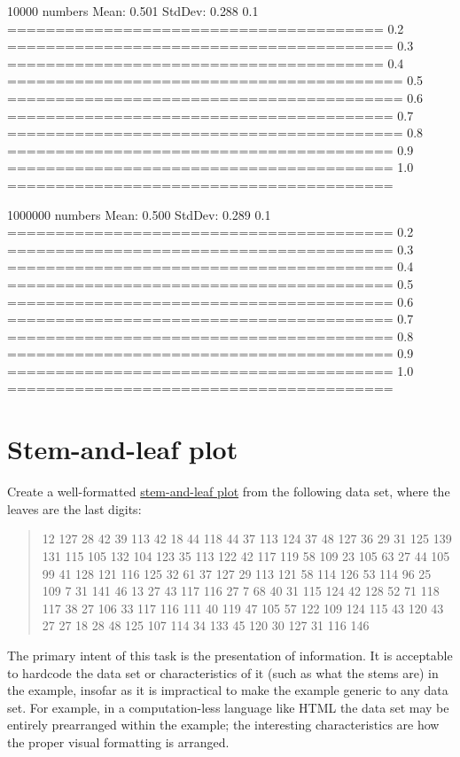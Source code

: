 \begin{itemize}
\begin{wideverbatim}
10000 numbers
Mean:   0.501
StdDev: 0.288
0.1 =======================================
0.2 ========================================
0.3 =======================================
0.4 =========================================
0.5 =========================================
0.6 ========================================
0.7 =========================================
0.8 ========================================
0.9 ========================================
1.0 ========================================

1000000 numbers
Mean:   0.500
StdDev: 0.289
0.1 ========================================
0.2 ========================================
0.3 ========================================
0.4 ========================================
0.5 ========================================
0.6 ========================================
0.7 ========================================
0.8 ========================================
0.9 ========================================
1.0 ========================================

\end{wideverbatim}

\pagebreak{}
\section*{Stem-and-leaf plot}

Create a well-formatted
\href{http://en.wikipedia.org/wiki/Stem-and-leaf\_plot}{stem-and-leaf
plot} from the following data set, where the leaves are the last digits:

\begin{quote}
12 127 28 42 39 113 42 18 44 118 44 37 113 124 37 48 127 36 29 31 125
139 131 115 105 132 104 123 35 113 122 42 117 119 58 109 23 105 63 27 44
105 99 41 128 121 116 125 32 61 37 127 29 113 121 58 114 126 53 114 96
25 109 7 31 141 46 13 27 43 117 116 27 7 68 40 31 115 124 42 128 52 71
118 117 38 27 106 33 117 116 111 40 119 47 105 57 122 109 124 115 43 120
43 27 27 18 28 48 125 107 114 34 133 45 120 30 127 31 116 146
\end{quote}

The primary intent of this task is the presentation of information. It
is acceptable to hardcode the data set or characteristics of it (such as
what the stems are) in the example, insofar as it is impractical to make
the example generic to any data set. For example, in a computation-less
language like HTML the data set may be entirely prearranged within the
example; the interesting characteristics are how the proper visual
formatting is arranged.


\end{itemize}
